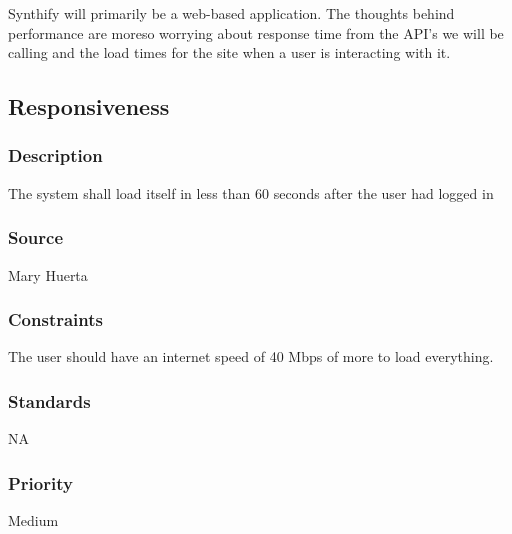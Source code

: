 Synthify will primarily be a web-based application. The thoughts behind performance are moreso worrying about response time from the API's we will be calling and the load times for the site when a user is interacting with it.

\subsection{Responsiveness}
\subsubsection{Description}
The system shall load itself in less than 60 seconds after the user had logged in
\subsubsection{Source}
Mary Huerta
\subsubsection{Constraints}
The user should have an internet speed of 40 Mbps of more to load everything.
\subsubsection{Standards}
NA
\subsubsection{Priority}
Medium